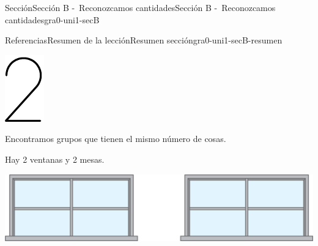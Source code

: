 \documentclass[twoside,10pt,]{article}
\begin{document}
\begin{sectionptx}{Sección}{Sección B -~Reconozcamos cantidades}{}{Sección B -~Reconozcamos cantidades}{}{}{gra0-uni1-secB}
\begin{references-subsection}{Referencias}{Resumen de la lección}{}{Resumen sección}{}{}{gra0-uni1-secB-resumen}
\begin{sidebyside}{2}{0.1}{0.1}{0.2}
\begin{sbspanel}{0.1}
\includegraphics[width=\linewidth]{external/svg-source/tikz-file-136325.pdf}
\end{sbspanel}%
\end{sidebyside}%
%
\par
Encontramos grupos que tienen el mismo número de cosas.%
\par
Hay 2 ventanas y 2 mesas.%
\begin{sidebyside}{2}{0.025}{0.025}{0.05}%
\begin{sbspanel}{0.5}%
\includegraphics[width=\linewidth]{external/png-source/2-windows.png}

\end{sbspanel}
\end{sidebyside}
\end{references-subsection}
\end{sectionptx}
\end{document}
